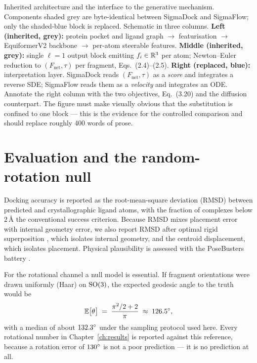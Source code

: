 {Inherited architecture and the interface to the generative mechanism.
Components shaded grey are byte-identical between SigmaDock and SigmaFlow;
only the shaded-blue block is replaced.}
{Schematic in three columns.
\textbf{Left (inherited, grey):} protein pocket and ligand graph
$\rightarrow$ featurisation $\rightarrow$ EquiformerV2 backbone
$\rightarrow$ per-atom steerable features.
\textbf{Middle (inherited, grey):} single $\ell=1$ output block emitting
$f_i \in \mathbb{R}^3$ per atom; Newton--Euler reduction to
$(F_{\mathrm{net}}, \tau)$ per fragment, Eqs.~(2.4)--(2.5).
\textbf{Right (replaced, blue):} interpretation layer. SigmaDock reads
$(F_{\mathrm{net}},\tau)$ as a \emph{score} and integrates a reverse SDE;
SigmaFlow reads them as a \emph{velocity} and integrates an ODE.
Annotate the right column with the two objectives, Eq.~(3.20) and the
diffusion counterpart. The figure must make visually obvious that the
substitution is confined to one block --- this is the evidence for the
controlled comparison and should replace roughly 400 words of prose.}

\section{Evaluation and the random-rotation null}
\label{sec:metrics}

Docking accuracy is reported as the root-mean-square deviation (RMSD) between
predicted and crystallographic ligand atoms, with the fraction of complexes
below $2$\,\AA{} the conventional success criterion. Because RMSD mixes
placement error with internal geometry error, we also report RMSD after
optimal rigid superposition \citep{kabsch1976solution}, which isolates
internal geometry, and the centroid displacement, which isolates placement.
Physical plausibility is assessed with the PoseBusters battery
\citep{buttenschoen2024posebusters}.

For the rotational channel a null model is essential. If fragment
orientations were drawn uniformly (Haar) on $\mathrm{SO}(3)$, the expected geodesic
angle to the truth would be
\begin{equation}
  \mathbb{E}\bigl[\theta\bigr] \;=\; \frac{\pi^2/2 + 2}{\pi}
  \;\approx\; 126.5^{\circ},
  \label{eq:haar-null}
\end{equation}
with a median of about $132.3^{\circ}$ under the sampling protocol used here.
Every rotational number in Chapter~\ref{ch:results} is reported against this
reference, because a rotation error of $130^{\circ}$ is not a poor prediction ---
it is no prediction at all.
